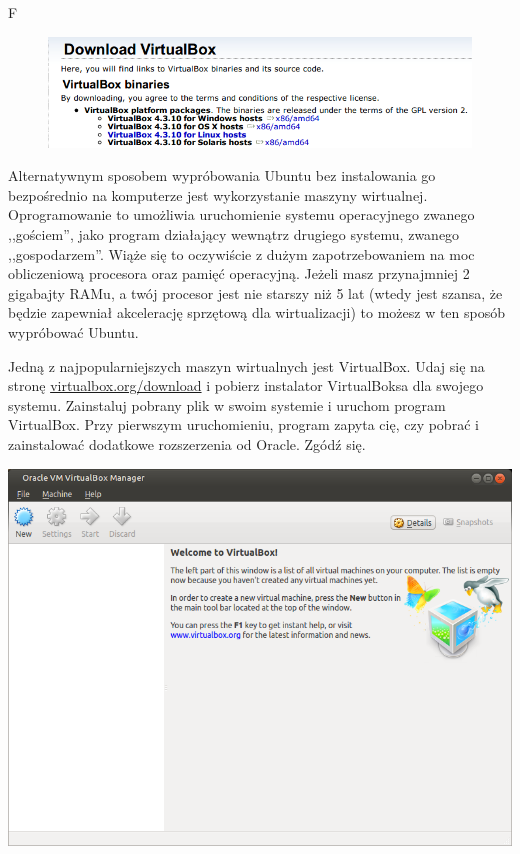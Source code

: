 F\begin{figure}
                \includegraphics[width=\linewidth]{images/virtualbox_download.png}
\end{figure}

Alternatywnym sposobem wypróbowania Ubuntu bez instalowania go bezpośrednio na komputerze jest wykorzystanie maszyny wirtualnej. Oprogramowanie to umożliwia uruchomienie systemu operacyjnego zwanego ,,gościem'', jako program działający wewnątrz drugiego systemu, zwanego ,,gospodarzem''. Wiąże się to oczywiście z dużym zapotrzebowaniem na moc obliczeniową procesora oraz pamięć operacyjną. Jeżeli masz przynajmniej 2 gigabajty RAMu, a twój procesor jest nie starszy niż 5 lat (wtedy jest szansa, że będzie zapewniał akcelerację sprzętową dla wirtualizacji) to możesz w ten sposób wypróbować Ubuntu.

Jedną z najpopularniejszych maszyn wirtualnych jest VirtualBox. Udaj się na stronę \href{https://www.virtualbox.org/wiki/Downloads}{virtualbox.org/download} i pobierz instalator VirtualBoksa dla swojego systemu. Zainstaluj pobrany plik w swoim systemie i uruchom program VirtualBox. Przy pierwszym uruchomieniu, program zapyta cię, czy pobrać i zainstalować dodatkowe rozszerzenia od Oracle. Zgódź się.
\clearpage
\begin{center}
        \includegraphics[scale=0.7]{images/virtualbox_main.png}
\end{center}

